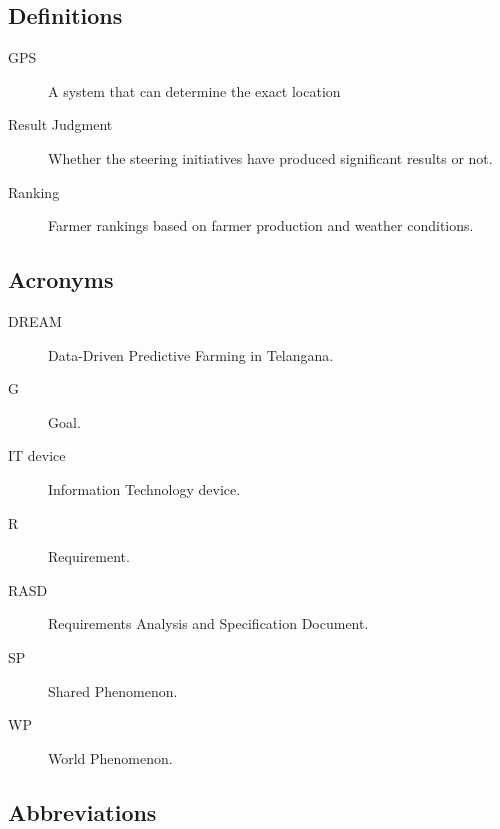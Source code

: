 \documentclass[../../main.tex]{subfiles}
\begin{document}
\subsection{Definitions}

\begin{description}
    
    \item[GPS] A system that can determine the exact location
    
    \item[Result Judgment] Whether the steering initiatives have produced significant results or not.
    
    \item[Ranking] Farmer rankings based on farmer production and weather conditions.

\end{description}

\subsection{Acronyms}

\begin{description}
    
    \item[DREAM] Data-Driven Predictive Farming in Telangana.
    
    \item[G] Goal.
    
    \item[IT device] Information Technology device.
    
    \item[R] Requirement. 
    
    \item[RASD] Requirements Analysis and Specification Document.
    
    \item[SP] Shared Phenomenon.
    
    \item[WP] World Phenomenon.
\end{description}

\subsection{Abbreviations}
\end{document}
